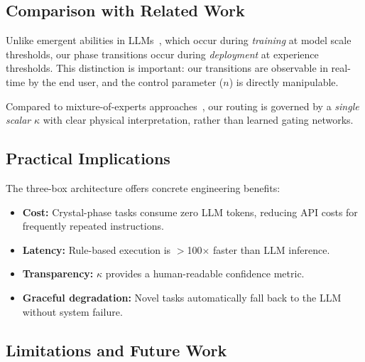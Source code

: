 \documentclass[10pt,twocolumn]{article}
\newcommand{\kap}{\kappa}
\begin{document}
\vspace{0.5cm}

\subsection{Comparison with Related Work}

Unlike emergent abilities in LLMs~\cite{wei2022}, which 
occur during \textit{training} at model scale thresholds, 
our phase transitions occur during \textit{deployment} at 
experience thresholds. This distinction is important: our 
transitions are observable in real-time by the end user, 
and the control parameter ($n$) is directly manipulable.

Compared to mixture-of-experts approaches~\cite{shazeer2017}, 
our routing is governed by a \textit{single scalar} $\kap$ 
with clear physical interpretation, rather than learned 
gating networks.

\subsection{Practical Implications}

The three-box architecture offers concrete engineering 
benefits:
\begin{itemize}[leftmargin=*, itemsep=2pt]
  \item \textbf{Cost:} Crystal-phase tasks consume zero LLM 
    tokens, reducing API costs for frequently repeated 
    instructions.
  \item \textbf{Latency:} Rule-based execution is 
    $>$100$\times$ faster than LLM inference.
  \item \textbf{Transparency:} $\kap$ provides a 
    human-readable confidence metric.
  \item \textbf{Graceful degradation:} Novel tasks 
    automatically fall back to the LLM without system 
    failure.
\end{itemize}

\subsection{Limitations and Future Work}
\end{document}
